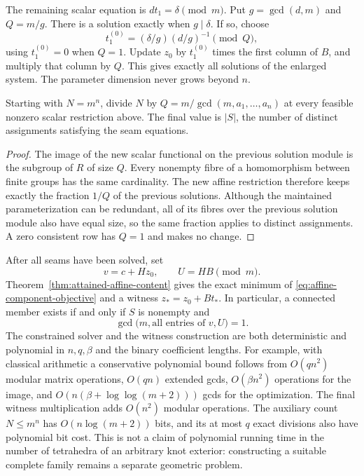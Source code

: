 The remaining scalar equation is $d t_1=\delta\pmod m$.  Put
$g=\gcd(d,m)$ and $Q=m/g$.  There is a solution exactly when $g\mid\delta$.
If so, choose
\[
 t_1^{(0)}=(\delta/g)(d/g)^{-1}\pmod Q,
\]
using $t_1^{(0)}=0$ when $Q=1$.  Update $z_0$ by
$t_1^{(0)}$ times the first column of $B$, and multiply that column by
$Q$.  This gives exactly all solutions of the enlarged system.  The
parameter dimension never grows beyond $n$.

\begin{proposition}
Starting with $N=m^n$, divide $N$ by $Q=m/\gcd(m,a_1,\ldots,a_n)$
at every feasible nonzero scalar restriction above.  The final value is
$|S|$, the number of distinct assignments satisfying the seam equations.
\end{proposition}

\begin{proof}
The image of the new scalar functional on the previous solution module
is the subgroup of $R$ of size $Q$.  Every nonempty fibre of a homomorphism
between finite groups has the same cardinality.  The new affine restriction
therefore keeps exactly the fraction $1/Q$ of the previous solutions.
Although the maintained parameterization can be redundant, all of its
fibres over the previous solution module also have equal size, so the
same fraction applies to distinct assignments.  A zero consistent row
has $Q=1$ and makes no change.
\end{proof}

After all seams have been solved, set
\[
 v=c+Hz_0,\qquad U=HB\pmod m.
\]
Theorem~\ref{thm:attained-affine-content} gives the exact minimum of
\eqref{eq:affine-component-objective} and a witness $z_*=z_0+Bt_*$.
In particular, a connected member exists if and only if $S$ is nonempty
and
\begin{equation}
 \gcd\bigl(m,\text{all entries of }v,U\bigr)=1.
 \label{eq:affine-connected-criterion}
\end{equation}
The constrained solver and the witness construction are both deterministic
and polynomial in $n,q,\beta$ and the binary coefficient lengths.
For example, with classical arithmetic a conservative polynomial bound
follows from $O(qn^2)$ modular matrix operations, $O(qn)$ extended gcds,
$O(\beta n^2)$ operations for the image, and
$O(n(\beta+\log\log(m+2)))$ gcds for the optimization. The final
witness multiplication adds $O(n^2)$ modular operations. The auxiliary
count $N\le m^n$ has $O(n\log(m+2))$ bits, and its at most $q$ exact
divisions also have polynomial bit cost. This is not a
claim of polynomial running time in the number of tetrahedra of an
arbitrary knot exterior: constructing a suitable complete family remains
a separate geometric problem.


